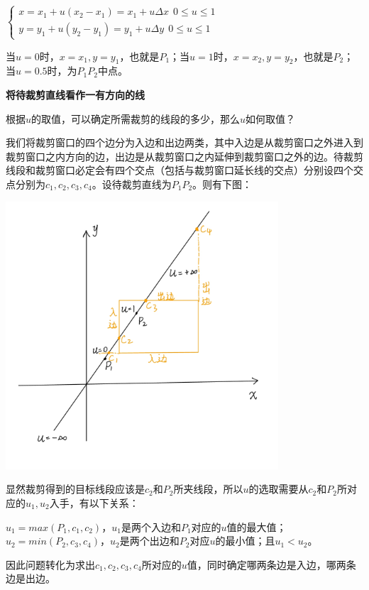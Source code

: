 \documentclass[a4paper,UTF8]{article}
\theoremstyle{definition}
\begin{document}
\begin{center}
	$
	\begin{cases}  
		x=x_1+u(x_2-x_1) = x_1 + u\Delta x\ \ 0\leq u\leq 1 \\
		y=y_1+u(y_2-y_1) = y_1 + u\Delta y\ \ 0\leq u\leq 1 
	\end{cases} 
	$
\end{center}

当$u=0$时，$x=x_1,y=y_1$，也就是$P_1$；当$u=1$时，$x=x_2,y=y_2$，也就是$P_2$；当$u=0.5$时，为$P_1P_2$中点。

\textbf{将待裁剪直线看作一有方向的线}

根据$u$的取值，可以确定所需裁剪的线段的多少，那么$u$如何取值？

我们将裁剪窗口的四个边分为入边和出边两类，其中入边是从裁剪窗口之外进入到裁剪窗口之内方向的边，出边是从裁剪窗口之内延伸到裁剪窗口之外的边。待裁剪线段和裁剪窗口必定会有四个交点（包括与裁剪窗口延长线的交点）分别设四个交点分别为$c_1,c_2,c_3,c_4$。设待裁剪直线为$P_1P_2$。则有下图：

\begin{center}
	\includegraphics[width=4in]{报告/3.png}
\end{center}

显然裁剪得到的目标线段应该是$c_2$和$P_2$所夹线段，所以$u$的选取需要从$c_2$和$P_2$所对应的$u_1,u_2$入手，有以下关系：

$u_1=max(P_1,c_1,c_2)$，$u_1$是两个入边和$P_1$对应的$u$值的最大值；$u_2=min(P_2,c_3,c_4)$，$u_2$是两个出边和$P_2$对应$u$的最小值；且$u_1<u_2$。

因此问题转化为求出$c_1,c_2,c_3,c_4$所对应的$u$值，同时确定哪两条边是入边，哪两条边是出边。
\end{document}
